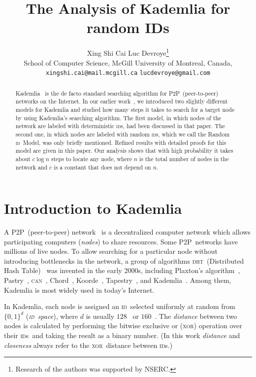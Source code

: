 \documentclass{article}
\title{The Analysis of Kademlia for random IDs}
\author{
    Xing Shi Cai \hspace{8 mm} Luc Devroye\thanks{Research of the authors was supported
    by NSERC.}\\
    \small School of Computer Science, McGill University of Montreal, Canada,\\
    \small \texttt{xingshi.cai@mail.mcgill.ca} \hspace{8 mm} \texttt{lucdevroye@gmail.com}
}
\newcommand{\dht}{{\scshape dht}}
\newcommand{\id}{{\scshape id}}
\newcommand{\ids}{{\id s}}
\newcommand{\xor}{{\scshape xor}}
\newcommand{\ptwop}{{P2P}}
\begin{document}
\maketitle

\begin{abstract}
Kademlia~\citep{Maymounkov02} is the de facto standard searching algorithm for
\ptwop\ (peer-to-peer) networks on the Internet.  In our earlier
work~\citep{Cai2013}, we introduced two slightly different models for Kademlia
and studied how many steps it takes to search for a target node by using
Kademlia's searching algorithm. The first model, in which nodes of the network
are labeled with deterministic \ids, had been discussed in that paper.  The
second one, in which nodes are labeled with random \ids, which we call the
Random \id\ Model, was only briefly mentioned.  Refined results with detailed
proofs for this model are given in this paper. Our analysis shows that with
high probability it takes about $c \log n$ steps to locate any node, where $n$
is the total number of nodes in the network and $c$ is a constant that does not
depend on $n$.
\end{abstract}

\section{Introduction to Kademlia}

A \ptwop\ (peer-to-peer) network~\citep{Schollmeier2001} is a decentralized
computer network which allows participating computers (\emph{nodes}) to share
resources.  Some \ptwop\ networks have millions of live nodes.  To allow
searching for a particular node without introducing bottlenecks in the network,
a group of algorithms  \dht\ (Distributed Hash Table)~\citep{Balakrishnan03}
was invented in the early 2000s, including Plaxton's
algorithm~\citep{Plaxton1999accessing}, Pastry~\citep{Rowstron01}, {\scshape
can}~\citep{Ratnasamy2001}, Chord~\citep{Stoica2001},
Koorde~\citep{Kaashoek2003koorde}, Tapestry~\citep{Zhao04}, and
Kademlia~\citep{Maymounkov02}. Among them, Kademlia is most widely used in
today's Internet.

In Kademlia, each node is assigned an \id\ selected uniformly at random from
$\{0,1\}^d$ (\emph{\id\ space}), where $d$ is usually $128$~\citep{Steiner07} or
$160$~\citep{Crosby07}. The \emph{distance} between two nodes is calculated by
performing the bitwise exclusive or (\xor) operation over their \ids\ and taking the result
as a binary number. (In this work \emph{distance} and \emph{closeness} always
refer to the \xor\ distance between \ids.) 
\end{document}
